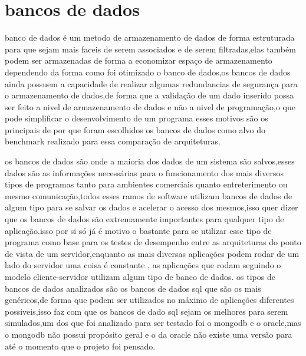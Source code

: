 \documentclass[
	12pt,				%
	openright,			%
	oneside,			%
	a4paper,			%
	english,			%
	french,				%
	spanish,			%
	brazil,				%
	]{abntex2}
\begin{document}
\section{bancos de dados}
\label{sec: bancos de dados}
banco de dados é um metodo de armazenamento de dados de forma estruturada para que sejam mais faceis de serem associados e de serem filtradas,elas também podem ser armazenadas de forma a economizar espaço de armazenamento dependendo da forma como foi otimizado o banco de dados,os bancos de dados ainda possuem a capacidade de realizar algumas redundancias de segurança para o armazenamento de dados,de forma que a validação de um dado inserido possa ser feito a nivel de armazenamento de dados e não a nivel de programação,o que pode simplificar o desenvolvimento de um programa
esses motivos são os principais de por que foram escolhidos os bancos de dados como alvo do benchmark realizado para essa comparação de arquiteturas.

os bancos de dados são onde a maioria dos dados de um sistema são salvos,esses dados são as informações necessárias para o funcionamento dos mais diversos tipos de programas tanto para ambientes comerciais quanto entreterimento ou mesmo comunicação,todos esses ramos de software utilizam bancos de dados de algum tipo para se salvar os dados e acelerar o acesso dos mesmos,isso quer dizer que os bancos de dados são extremamente importantes para qualquer tipo de aplicação.isso por si só já é motivo o bastante para se utilizar esse tipo de programa como base para os testes de desempenho entre as arquiteturas do ponto de vista de um servidor,enquanto as mais diversas aplicações podem rodar de um lado do servidor uma coisa é constante , as aplicações que rodam seguindo o modelo cliente-servidor utilizam algum tipo de banco de dados.\newline
os tipos de bancos de dados analizados são os bancos de dados sql que são os mais genéricos,de forma que podem ser utilizados no máximo de aplicações diferentes possiveis,isso faz com que os bancos de dado sql sejam os melhores para serem simulados,um dos que foi analizado para ser testado foi o mongodb e o oracle,mas o mongodb não possui propósito geral e o da oracle não existe uma versão para  até o momento que o projeto foi pensado.
\end{document}
